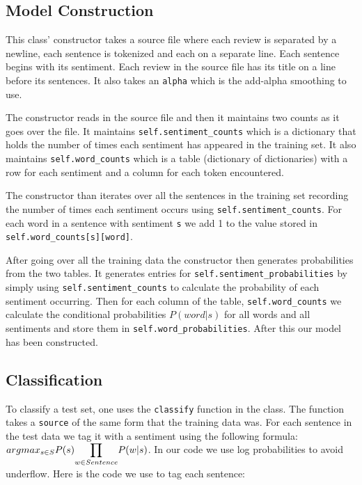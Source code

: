\documentclass{article}
\begin{document}
\subsection{Model Construction}

This class' constructor takes a source file where each review is separated by a newline, each sentence is tokenized and each on a separate line. Each sentence begins with its sentiment. Each review in the source file has its title on a line before its sentences. It also takes an \texttt{alpha} which is the add-alpha smoothing to use.

The constructor reads in the source file and then it maintains two counts as it goes over the file. It maintains \texttt{self.sentiment\_counts} which is a dictionary that holds the number of times each sentiment has appeared in the training set. It also maintains \texttt{self.word\_counts} which is a table (dictionary of dictionaries) with a row for each sentiment and a column for each token encountered. 

The constructor than iterates over all the sentences in the training set recording the number of times each sentiment occurs using \texttt{self.sentiment\_counts}. For each word in a sentence with sentiment \texttt{s} we add 1 to the value stored in \texttt{self.word\_counts[s][word]}. 

After going over all the training data the constructor then generates probabilities from the two tables. It generates entries for \texttt{self.sentiment\_probabilities} by simply using \texttt{self.sentiment\_counts} to calculate the probability of each sentiment occurring. Then for each column of the table, \texttt{self.word\_counts} we calculate the conditional probabilities $P(word|s)$ for all words and all sentiments and store them in \texttt{self.word\_probabilities}. After this our model has been constructed.

\subsection{Classification}

To classify a test set, one uses the \texttt{classify} function in the class. The function takes a \texttt{source} of the same form that the training data was. For each sentence in the test data we tag it with a sentiment using the following formula: $argmax_{s\in S}P(s)\mathlarger{\prod}_{w\in Sentence} P(w|s)$. In our code we use log probabilities to avoid underflow. Here is the code we use to tag each sentence:
\end{document}
